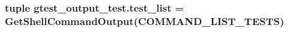 \hypertarget{namespacegtest__output__test_a2da84cfb32bbb8634f1f5853795d6051}{
\subsubsection[{test\-\_\-list}]{\setlength{\rightskip}{0pt plus 5cm}tuple gtest\-\_\-output\-\_\-test.\-test\-\_\-list = {\bf Get\-Shell\-Command\-Output}({\bf C\-O\-M\-M\-A\-N\-D\-\_\-\-L\-I\-S\-T\-\_\-\-T\-E\-S\-T\-S})}}\label{namespacegtest__output__test_a2da84cfb32bbb8634f1f5853795d6051}
